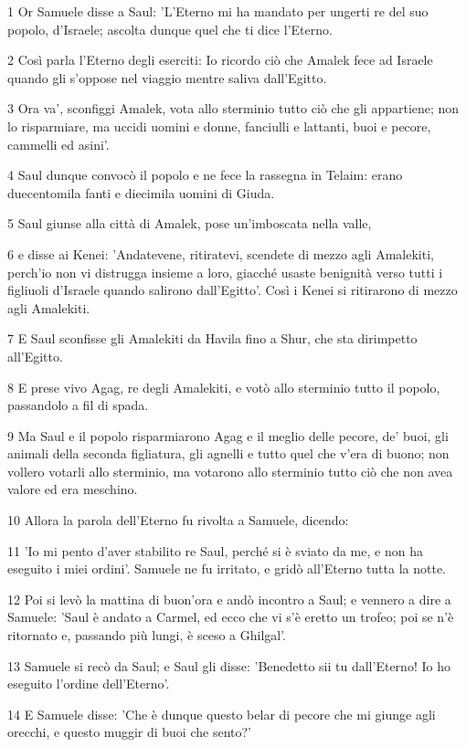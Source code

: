 \par 1 Or Samuele disse a Saul: 'L'Eterno mi ha mandato per ungerti re del suo popolo, d'Israele; ascolta dunque quel che ti dice l'Eterno.
\par 2 Così parla l'Eterno degli eserciti: Io ricordo ciò che Amalek fece ad Israele quando gli s'oppose nel viaggio mentre saliva dall'Egitto.
\par 3 Ora va', sconfiggi Amalek, vota allo sterminio tutto ciò che gli appartiene; non lo risparmiare, ma uccidi uomini e donne, fanciulli e lattanti, buoi e pecore, cammelli ed asini'.
\par 4 Saul dunque convocò il popolo e ne fece la rassegna in Telaim: erano duecentomila fanti e diecimila uomini di Giuda.
\par 5 Saul giunse alla città di Amalek, pose un'imboscata nella valle,
\par 6 e disse ai Kenei: 'Andatevene, ritiratevi, scendete di mezzo agli Amalekiti, perch'io non vi distrugga insieme a loro, giacché usaste benignità verso tutti i figliuoli d'Israele quando salirono dall'Egitto'. Così i Kenei si ritirarono di mezzo agli Amalekiti.
\par 7 E Saul sconfisse gli Amalekiti da Havila fino a Shur, che sta dirimpetto all'Egitto.
\par 8 E prese vivo Agag, re degli Amalekiti, e votò allo sterminio tutto il popolo, passandolo a fil di spada.
\par 9 Ma Saul e il popolo risparmiarono Agag e il meglio delle pecore, de' buoi, gli animali della seconda figliatura, gli agnelli e tutto quel che v'era di buono; non vollero votarli allo sterminio, ma votarono allo sterminio tutto ciò che non avea valore ed era meschino.
\par 10 Allora la parola dell'Eterno fu rivolta a Samuele, dicendo:
\par 11 'Io mi pento d'aver stabilito re Saul, perché si è sviato da me, e non ha eseguito i miei ordini'. Samuele ne fu irritato, e gridò all'Eterno tutta la notte.
\par 12 Poi si levò la mattina di buon'ora e andò incontro a Saul; e vennero a dire a Samuele: 'Saul è andato a Carmel, ed ecco che vi s'è eretto un trofeo; poi se n'è ritornato e, passando più lungi, è sceso a Ghilgal'.
\par 13 Samuele si recò da Saul; e Saul gli disse: 'Benedetto sii tu dall'Eterno! Io ho eseguito l'ordine dell'Eterno'.
\par 14 E Samuele disse: 'Che è dunque questo belar di pecore che mi giunge agli orecchi, e questo muggir di buoi che sento?'
